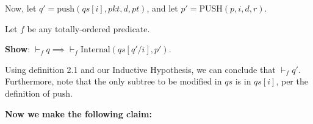\documentclass{article}
\begin{document}
Now, let $q' = \text{push}(qs[i], pkt, d, pt)$, and let $p' = \text{PUSH}(p, i, d, r)$.\newline

\noindent Let $f$ be any totally-ordered predicate.\newline

\textbf{Show}: $\vdash_f q \implies \vdash_f \text{Internal}(qs[q'/i], p')$.\newline

Using definition 2.1 and our Inductive Hypothesis, we can conclude that $\vdash_f q'$. Furthermore, note that the only subtree to be modified in $qs$ is in $qs[i]$, per the definition of $\text{push}$.\newline

\textbf{Now we make the following claim:}\\[-20pt]
\end{document}
